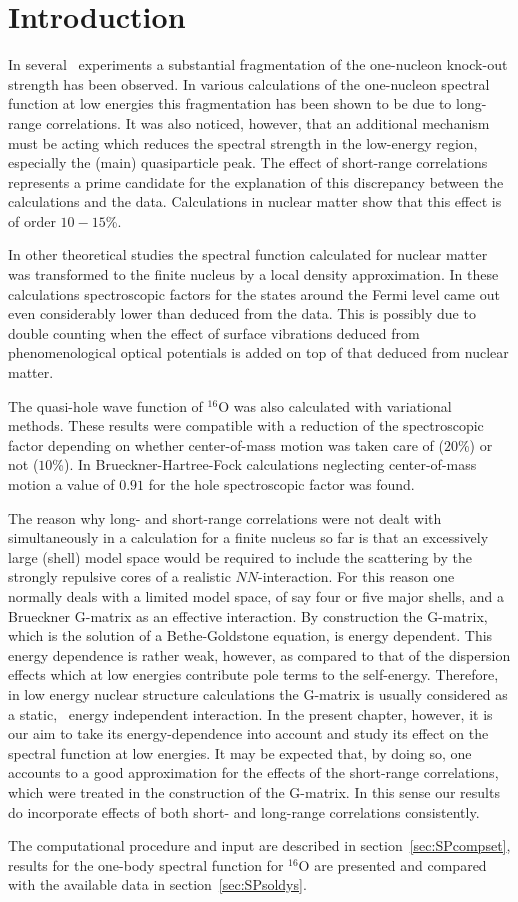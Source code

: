 \section{Introduction}
In several \eep\ experiments%
\cite{HBJ88,Qu88a,Kr90,Ste91} a substantial 
fragmentation of the one-nucleon knock-out strength has been observed. 
In various calculations of the one-nucleon spectral 
function at low energies\cite{BRM91,RGBA93,NWR91,MS93} 
this fragmentation has been 
shown to be 
due to long-range correlations. It was also noticed, however, that an 
additional mechanism must be acting which reduces the spectral strength in the 
low-energy region, especially the (main) quasiparticle peak. 
The effect of short-range 
correlations represents a prime candidate for the explanation of 
this discrepancy between 
the calculations and the data. 
Calculations in nuclear matter\cite{RPD89} show that this effect is of order
$10-15$\%.

In other theoretical studies the spectral function calculated for nuclear 
matter was transformed to the finite nucleus by a 
local density approximation\cite{NDG95}. 
In these calculations spectroscopic 
factors for the states around the Fermi level 
came out even considerably lower than 
deduced from the data. This is possibly due to double counting 
when the effect of surface vibrations deduced from phenomenological optical 
potentials is added on top of that deduced from nuclear matter.

The quasi-hole wave function of $^{16}$O was also calculated with variational 
methods\cite{RBP94}. These results were compatible with a 
reduction of the spectroscopic factor depending on whether center-of-mass 
motion was taken care of ($20$\%) or not ($10$\%). 
In Brueckner-Hartree-Fock 
calculations\cite{MD94} neglecting center-of-mass motion a value of $0.91$ 
for the hole spectroscopic factor was found.

The reason why long- and short-range correlations were not dealt with 
simultaneously in a 
calculation for a finite nucleus so far 
is that an excessively large (shell) model 
space would be required to include the scattering by the strongly repulsive 
cores of a realistic $NN$-interaction. For this reason one normally deals with 
a limited model space, of say four or five major shells, and a Brueckner 
G-matrix as an effective interaction. By construction the G-matrix, which is 
the  solution of a Bethe-Goldstone equation, is energy dependent. This energy 
dependence is rather weak, however, as compared to that of the dispersion 
effects which at low energies contribute pole terms to the self-energy. 
Therefore, in low energy nuclear structure calculations the G-matrix is 
usually considered as a static, \ie\ energy independent interaction. In the 
present chapter,
however, it is our aim to take its energy-dependence into account 
and study its effect on the spectral function at low energies. It may be 
expected that, by doing so, one accounts to a good approximation for the 
effects of the short-range correlations, which were treated in the 
construction of the G-matrix. In this sense our results do incorporate 
effects of both short- and long-range correlations consistently.

The computational procedure and input are described in 
section~\ref{sec:SPcompset}, results for the one-body spectral function for
$^{16}$O are presented and compared with the available data
in section~\ref{sec:SPsoldys}.
